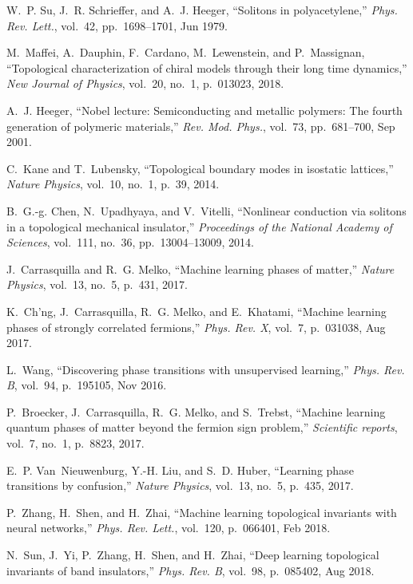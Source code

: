 \documentclass[10pt]{revtex4-1}
\begin{document}
\begin{thebibliography}{10}
W.~P. Su, J.~R. Schrieffer, and A.~J. Heeger, ``Solitons in polyacetylene,''
  {\em Phys. Rev. Lett.}, vol.~42, pp.~1698--1701, Jun 1979.

M.~Maffei, A.~Dauphin, F.~Cardano, M.~Lewenstein, and P.~Massignan,
  ``Topological characterization of chiral models through their long time
  dynamics,'' {\em New Journal of Physics}, vol.~20, no.~1, p.~013023, 2018.

A.~J. Heeger, ``Nobel lecture: Semiconducting and metallic polymers: The fourth
  generation of polymeric materials,'' {\em Rev. Mod. Phys.}, vol.~73,
  pp.~681--700, Sep 2001.

C.~Kane and T.~Lubensky, ``Topological boundary modes in isostatic lattices,''
  {\em Nature Physics}, vol.~10, no.~1, p.~39, 2014.

B.~G.-g. Chen, N.~Upadhyaya, and V.~Vitelli, ``Nonlinear conduction via
  solitons in a topological mechanical insulator,'' {\em Proceedings of the
  National Academy of Sciences}, vol.~111, no.~36, pp.~13004--13009, 2014.

J.~Carrasquilla and R.~G. Melko, ``Machine learning phases of matter,'' {\em
  Nature Physics}, vol.~13, no.~5, p.~431, 2017.

K.~Ch'ng, J.~Carrasquilla, R.~G. Melko, and E.~Khatami, ``Machine learning
  phases of strongly correlated fermions,'' {\em Phys. Rev. X}, vol.~7,
  p.~031038, Aug 2017.

L.~Wang, ``Discovering phase transitions with unsupervised learning,'' {\em
  Phys. Rev. B}, vol.~94, p.~195105, Nov 2016.

P.~Broecker, J.~Carrasquilla, R.~G. Melko, and S.~Trebst, ``Machine learning
  quantum phases of matter beyond the fermion sign problem,'' {\em Scientific
  reports}, vol.~7, no.~1, p.~8823, 2017.

E.~P. Van~Nieuwenburg, Y.-H. Liu, and S.~D. Huber, ``Learning phase transitions
  by confusion,'' {\em Nature Physics}, vol.~13, no.~5, p.~435, 2017.

P.~Zhang, H.~Shen, and H.~Zhai, ``Machine learning topological invariants with
  neural networks,'' {\em Phys. Rev. Lett.}, vol.~120, p.~066401, Feb 2018.

N.~Sun, J.~Yi, P.~Zhang, H.~Shen, and H.~Zhai, ``Deep learning topological
  invariants of band insulators,'' {\em Phys. Rev. B}, vol.~98, p.~085402, Aug
  2018.


\end{thebibliography}
\end{document}
